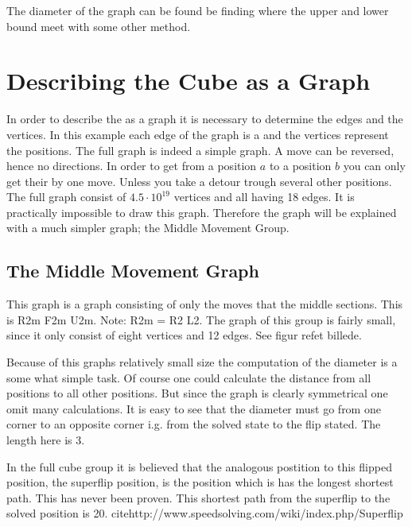 The diameter of the \rubik{} graph can be found be finding where the upper and lower bound meet with some other method.

\section{Describing the Cube as a Graph}
In order to describe the \rubik{} as a graph it is necessary to determine the edges and the vertices. In this example each edge of the graph is a \twist{} and the vertices represent the positions.  The full \rubiks{} graph is indeed a simple graph. A move can be reversed, hence no directions. In order to get from a position $a$ to a position $b$ you can only get their by one move. Unless you take a detour trough several other positions. The full \rubiks{} graph consist of $4.5\cdot10^{19}$ vertices and all having 18 edges. It is practically impossible to draw this graph. Therefore the graph will be explained with a much simpler graph; the Middle Movement Group.


\subsection{The Middle Movement Graph}
\label{sub:middleMoveGroup}
This graph is a \rubik{} graph consisting of only the moves that \twist{} the middle sections. This is R2m F2m U2m. Note: R2m = R2 L2.  The graph of this group is fairly small, since it only consist of eight vertices and 12 edges. See figur ref{et billede}.

Because of this graphs relatively small size the computation of the diameter is a some what simple task. Of course one could calculate the distance from all positions to all other positions. But since the graph is clearly symmetrical one omit many calculations. It is easy to see that the diameter must go from one corner to an opposite corner i.g. from the solved state to the flip stated. The length here is 3. 

In the full cube group it is believed that the analogous postition to this flipped position, the superflip position, is the position which is has the longest shortest path. This has never been proven. This shortest path from the superflip to the solved position is 20. cite{http://www.speedsolving.com/wiki/index.php/Superflip}